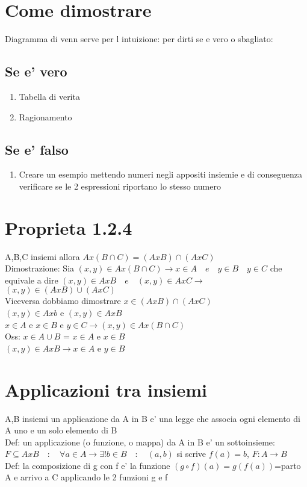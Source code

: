 \documentclass{article}
\begin{document}
    \section{Come dimostrare}
    Diagramma di venn serve per l intuizione: per dirti se e vero o sbagliato:
    \subsection{Se e' vero}
    \begin{enumerate}
        \item Tabella di verita
        \item Ragionamento
    \end{enumerate}
    \subsection{Se e' falso}
    \begin{enumerate}
        \item Creare un esempio mettendo numeri negli appositi insiemie e di conseguenza verificare se le 2 espressioni riportano lo stesso numero
    \end{enumerate}
   \section*{Proprieta 1.2.4}
   A,B,C insiemi allora $Ax(B\cap C)=(AxB)\cap(AxC)$\\
   Dimostrazione: Sia $(x,y)\in Ax(B \cap C)\to x\in A \quad e \quad y\in B \quad y\in C$
   che equivale a dire $(x,y)\in AxB \quad e \quad (x,y)\in AxC \to$\\
   $(x,y)\in (AxB)\cup(AxC)$\\
   Viceversa dobbiamo dimostrare $x\in (AxB)\cap(AxC)$\\
   $(x,y)\in Axb$ e $(x,y)\in AxB$\\
   $x\in A$ e $x\in B$ e $y\in C \to (x,y)\in Ax(B \cap C)$\\
   Oss: $x\in A\cup B$ = $x\in A$ e $x \in B$\\
   $(x,y)\in A x B \to x\in A $ e $y\in B$
   \section*{Applicazioni tra insiemi}
   A,B insiemi un applicazione da A in B e' una legge che associa ogni elemento
   di A uno e un solo elemento di B\\
   Def: un applicazione (o funzione, o mappa) da A in B e' un sottoinsieme:
   $F \subseteq AxB \quad : \quad \forall a \in A \to \exists! b\in B \quad : \quad (a,b)$
   si scrive $f(a)=b$, $F:A\to B$\\
   Def: la composizione di g con f e' la funzione $(g \circ f)(a)=g(f(a))$=parto A e arrivo a C applicando le 2 funzioni g e f
\end{document}
